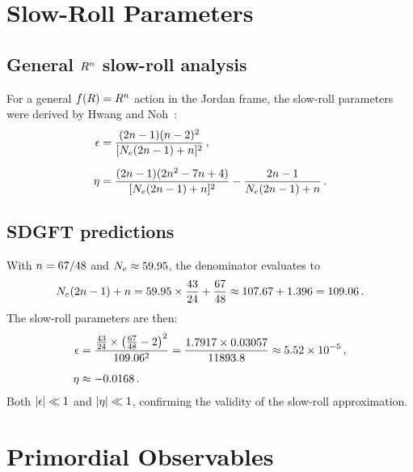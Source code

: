 \documentclass[a4paper,11pt]{article}
\begin{document}
\section{Slow-Roll Parameters}
\label{sec:slowroll}

\subsection{General $R^n$ slow-roll analysis}

For a general $f(R) = R^n$ action in the Jordan frame, the
slow-roll parameters were derived by Hwang and
Noh~\cite{Hwang2001}:
\begin{align}
  \epsilon &= \frac{(2n-1)(n-2)^2}
                  {[N_e(2n-1)+n]^2}\,,
  \label{eq:epsilon} \\[6pt]
  \eta &= \frac{(2n-1)(2n^2-7n+4)}
                  {[N_e(2n-1)+n]^2}
           - \frac{2n-1}{N_e(2n-1)+n}\,.
  \label{eq:eta}
\end{align}

\subsection{SDGFT predictions}

With $n = 67/48$ and $N_e \approx 59.95$, the denominator
evaluates to
\begin{equation}
  N_e(2n-1) + n
    = 59.95 \times \frac{43}{24} + \frac{67}{48}
    \approx 107.67 + 1.396
    = 109.06\,.
  \label{eq:denom}
\end{equation}
The slow-roll parameters are then:
\begin{align}
  \epsilon &= \frac{\tfrac{43}{24}\times\left(\tfrac{67}{48}-2
             \right)^2}{109.06^2}
           = \frac{1.7917 \times 0.03057}{11893.8}
           \approx 5.52 \times 10^{-5}\,,
  \label{eq:epsilon_val} \\[6pt]
  \eta &\approx -0.0168\,.
  \label{eq:eta_val}
\end{align}
Both $\lvert\epsilon\rvert \ll 1$ and $\lvert\eta\rvert \ll 1$,
confirming the validity of the slow-roll approximation.

\section{Primordial Observables}
\label{sec:observables}
\end{document}
